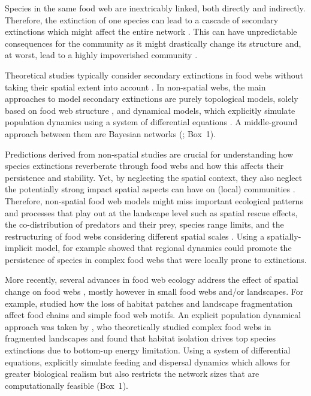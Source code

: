 \documentclass[11pt]{article}
\begin{document}
Species in the same food web are inextricably linked, both directly and indirectly. Therefore, the extinction of one species can lead to a cascade of secondary extinctions which might affect the entire network \citep{EbenmanJonsson2005, Dunne2009}. This can have unpredictable consequences for the community as it might drastically change its structure and, at worst, lead to a highly impoverished community \citep{EklofEbenman2006, Dunne2009}.

Theoretical studies typically consider secondary extinctions in food webs without taking their spatial extent into account \citep{EklofEbenman2006, Dunne2009, Staniczenko2010, Binzer2011, Curtsdotter2011, Broseetal2017}. In non-spatial webs, the main approaches to model secondary extinctions are purely topological models, solely based on food web structure \citep{Dunne2009}, and dynamical models, which explicitly simulate population dynamics using a system of differential equations \citep{Binzer2011, Curtsdotter2011}. A middle-ground approach between them are Bayesian networks (\citealp{Eklofetal2013MEE}; Box~1).

Predictions derived from non-spatial studies are crucial for understanding how species extinctions reverberate through food webs and how this affects their persistence and stability. Yet, by neglecting the spatial context, they also neglect the potentially strong impact spatial aspects can have on (local) communities \citep{GibertYeakel2019}. Therefore, non-spatial food web models might miss important ecological patterns and processes that play out at the landscape level such as spatial rescue effects, the co-distribution of predators and their prey, species range limits, and the restructuring of food webs considering different spatial scales \citep{Guzman2018}. Using a spatially-implicit model, \citet{Gravel2011PONE} for example showed that regional dynamics could promote the persistence of species in complex food webs that were locally prone to extinctions. 

More recently, several advances in food web ecology address the effect of spatial change on food webs \citep{Pillai2011, Eklof2012}, mostly however in small food webs and/or landscapes. For example, \citet{Liao2016, Liao2017JAE, Liao2017RSPB} studied how the loss of habitat patches and landscape fragmentation affect food chains and simple food web motifs. An explicit population dynamical approach was taken by \citet{Ryser2019}, who theoretically studied complex food webs in fragmented landscapes and found that habitat isolation drives top species extinctions due to bottom-up energy limitation. Using a system of differential equations, \citet{Ryser2019} explicitly simulate feeding and dispersal dynamics which allows for greater biological realism but also restricts the network sizes that are computationally feasible (Box~1).
\end{document}
